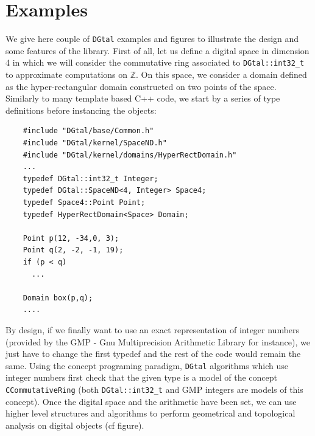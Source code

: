 \documentclass[11pt, a4paper]{article}
\def\DGtal{\texttt{DGtal} }
\begin{document}
\section*{Examples}
We give here couple of \DGtal examples and figures to illustrate the
design and some features of the library. First of all, let us define a
digital space in dimension 4 in which we will consider the commutative
ring associated to \texttt{DGtal::int32\_t} to approximate
computations on $\mathbb{Z}$. On this space, we consider a domain
defined as the hyper-rectangular domain constructed on two points of
the space. Similarly to many template based C++ code, we start by a
series of type definitions before instancing the objects:

{\scriptsize \begin{lstlisting}
    #include "DGtal/base/Common.h"
    #include "DGtal/kernel/SpaceND.h"
    #include "DGtal/kernel/domains/HyperRectDomain.h"
    ...
    typedef DGtal::int32_t Integer;
    typedef DGtal::SpaceND<4, Integer> Space4;
    typedef Space4::Point Point;
    typedef HyperRectDomain<Space> Domain;
    
    Point p(12, -34,0, 3);
    Point q(2, -2, -1, 19);
    if (p < q)
      ...
    
    Domain box(p,q);
    ....

  \end{lstlisting}
}
By design, if we finally want to use an exact representation of
integer numbers (provided by the GMP - Gnu Multiprecision Arithmetic
Library for instance), we just have to change the first typedef and
the rest of the code would remain the same. Using the concept
programing paradigm, \DGtal algorithms which use integer numbers first
check that the given type is a model of the concept
\texttt{CCommutativeRing} (both \texttt{DGtal::int32\_t} and GMP integers are
models of this concept). Once the digital space and the arithmetic
have been set, we can use higher level structures and algorithms to
perform geometrical and topological analysis on digital objects (cf figure).
\end{document}
